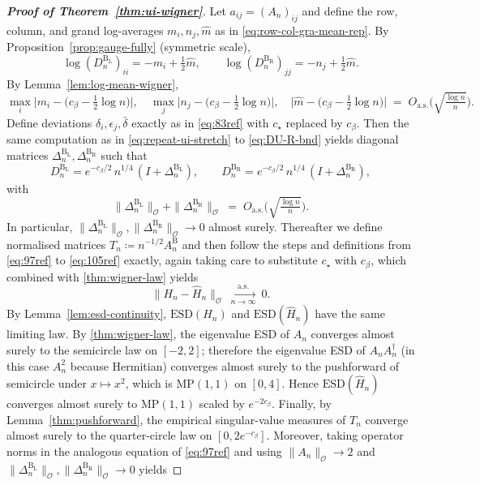 \documentclass[11pt,a4paper]{article}
\newcommand{\op}{\mathcal{O}}
\begin{document}
\begin{proof}[\textbf{Proof of Theorem~\ref{thm:ui-wigner}}]\label{proof-of-lem2}
Let $a_{ij}=(A_n)_{ij}$ and define the row, column, and grand log-averages $m_i,n_j,\hat m$ as in \cref{eq:row-col-gra-mean-rep}. By Proposition~\ref{prop:gauge-fully} (symmetric scale),
\begin{equation}\label{eq:gauge-symmetric-log-wigner}
\log(D^{\mathrm{B_L}}_{n})_{ii}=-m_i+\tfrac12\hat{m},\qquad
\log(D^{\mathrm{B_R}}_{n})_{jj}=-n_j+\tfrac12\hat{m}.
\end{equation}
By Lemma~\ref{lem:log-mean-wigner},
\begin{equation}\label{eq:log-mean-wigner-bnd}
\max_i\Big|m_i-\Big(c_\beta-\tfrac12\log n\Big)\Big|,\quad
\max_j\Big|n_j-\Big(c_\beta-\tfrac12\log n\Big)\Big|,\quad
\Big|\hat{m}-\Big(c_\beta-\tfrac12\log n\Big)\Big|
\;=\;O_{\mathrm{a.s.}}\!\Big(\sqrt{\tfrac{\log n}{n}}\Big).
\end{equation}
Define deviations $\delta_i,\epsilon_j,\bar\delta$ exactly as in \cref{eq:83ref} with $c_\star$ replaced by $c_\beta$. Then the same computation as in \cref{eq:repeat-ui-stretch} to \cref{eq:DU-R-bnd} yields diagonal matrices $\Delta^{\mathrm{B_L}}_{n},\Delta^{\mathrm{B_R}}_{n}$ such that
\begin{equation}\label{eq:DU-exp-wigner}
D^{\mathrm{B_L}}_{n}=e^{-c_\beta/2}\,n^{1/4}\,(I+\Delta^{\mathrm{B_L}}_{n}),\qquad
D^{\mathrm{B_R}}_{n}=e^{-c_\beta/2}\,n^{1/4}\,(I+\Delta^{\mathrm{B_R}}_{n}),
\end{equation}
with
\begin{equation}\label{eq:DeltaU-op-wigner}
\|\Delta^{\mathrm{B_L}}_{n}\|_{\op}+\|\Delta^{\mathrm{B_R}}_{n}\|_{\op}
\;=\;O_{\mathrm{a.s.}}\!\Big(\sqrt{\tfrac{\log n}{n}}\Big).
\end{equation}
In particular, $\|\Delta^{\mathrm{B_L}}_{n}\|_{\op},\|\Delta^{\mathrm{B_R}}_{n}\|_{\op}\to 0$ almost surely. Thereafter we define normalised matrices $T_n\coloneq n^{-1/2}A^{\mathrm{B}}_n$ and then follow the steps and definitions from \cref{eq:97ref} to \cref{eq:105ref} exactly, again taking care to substitute $c_\star$ with $c_\beta$, which combined with \cref{thm:wigner-law} yields
\begin{equation}\label{eq:Hhat-pert-wigner}
\|H_n-\widehat H_n\|_{\op}\ \xrightarrow[n\to\infty]{\mathrm{a.s.}}\ 0.
\end{equation}
By Lemma~\ref{lem:esd-continuity}, $\mathrm{ESD}(H_n)$ and $\mathrm{ESD}(\widehat H_n)$ have the same limiting law. By \cref{thm:wigner-law}, the eigenvalue ESD of $A_n$ converges almost surely to the semicircle law on $[-2,2]$; therefore the eigenvalue ESD of $A_nA_n^\dagger$ (in this case $A_n^2$ because Hermitian) converges almost surely to the pushforward of semicircle under $x\mapsto x^2$, which is $\mathrm{MP}(1,1)$ on $[0,4]$. Hence $\mathrm{ESD}(\widehat H_n)$ converges almost surely to $\mathrm{MP}(1,1)$ scaled by $e^{-2c_\beta}$. Finally, by Lemma~\ref{thm:pushforward}, the empirical singular-value measures of $T_n$ converge almost surely to the quarter-circle law on $[0,2e^{-c_\beta}]$. Moreover, taking operator norms in the analogous equation of \cref{eq:97ref} and using $\|A_n\|_{\op}\to 2$ and $\|\Delta^{\mathrm{B_L}}_{n}\|_{\op},\|\Delta^{\mathrm{B_R}}_{n}\|_{\op}\to 0$ yields

\end{proof}
\end{document}

